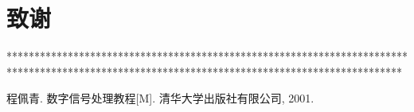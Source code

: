 \documentclass[12pt,a4paper]{article}
\begin{document}
{\newpage
\section*{致谢}

***********************************************************************************************************************************************
\newpage
}







\renewcommand\refname{参考文献}
\begin{thebibliography}{0}
%
程佩青. 数字信号处理教程[M]. 清华大学出版社有限公司, 2001.
%
%
\end{thebibliography}
\end{document}
